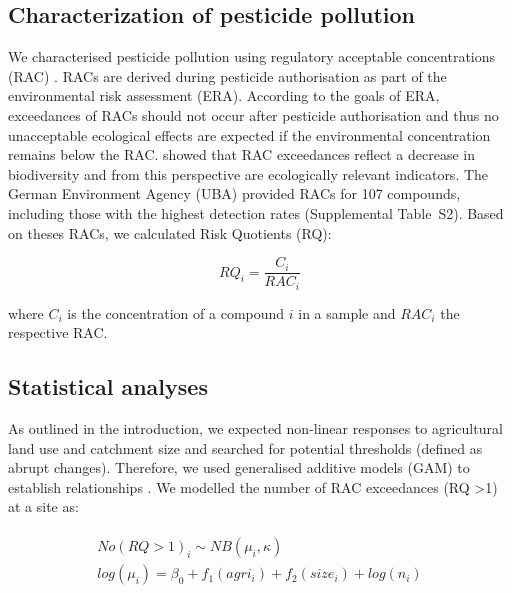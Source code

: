 \documentclass[journal=esthag,manuscript=article]{achemso}
\begin{document}
\subsection{Characterization of pesticide pollution}
We characterised pesticide pollution using regulatory acceptable concentrations (RAC) \citep{brock_linking_2010}.
RACs are derived during pesticide authorisation as part of the environmental risk assessment (ERA).
According to the goals of ERA, exceedances of RACs should not occur after pesticide authorisation \citep{stehle_pesticide_2015} and thus no unacceptable ecological effects are expected if the environmental concentration remains below the RAC. 
\citet{stehle_pesticide_2015} showed that RAC exceedances reflect a decrease in biodiversity and from this perspective are ecologically relevant indicators. 
The German Environment Agency (UBA) provided RACs for 107 compounds, including those with the highest detection rates (Supplemental Table~S2). 
Based on theses RACs, we calculated Risk Quotients (RQ):

\begin{equation}
RQ_i = \frac{C_i}{RAC_i}
\end{equation}

where $C_i$ is the concentration of a compound $i$ in a sample and $RAC_i$ the respective RAC.


\subsection{Statistical analyses}
As outlined in the introduction, we expected non-linear responses to agricultural land use and catchment size and searched for potential thresholds (defined as abrupt changes).
Therefore, we used generalised additive models (GAM) to establish relationships \citep{fewster_analysis_2000}.
We modelled the number of RAC exceedances (RQ \textgreater 1) at a site as:

\begin{align}
\begin{split}
  No(RQ > 1)_i \sim NB(\mu_i, \kappa) \\
  log(\mu_i)= \beta_0 + f_1(agri_i) + f_2(size_i) + log(n_i) \\
\end{split}
\end{align}
\end{document}
